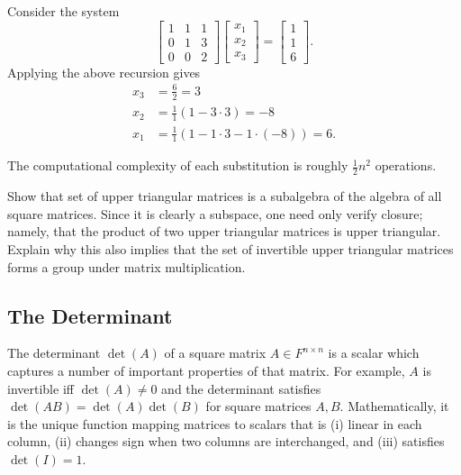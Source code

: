 \begin{example}
Consider the system
\begin{equation*}
\begin{bmatrix} 1 & 1 & 1 \\ 0 & 1 & 3 \\ 0 & 0 & 2 \end{bmatrix}
\begin{bmatrix} x_1 \\ x_2 \\ x_3 \end{bmatrix}
= \begin{bmatrix} 1 \\ 1 \\ 6 \end{bmatrix} .
\end{equation*}
Applying the above recursion gives
\begin{align*}
x_3 & = \frac{6}{2} = 3 \\
x_2 & = \frac{1}{1} (1 - 3\cdot 3) = -8 \\
x_1 & = \frac{1}{1} (1 - 1\cdot 3 - 1\cdot (-8) ) = 6. 
\end{align*}
\end{example}
The computational complexity of each substitution is roughly $\frac{1}{2} n^2$ operations.

\begin{problem}
Show that set of upper triangular matrices is a subalgebra of the algebra of all square matrices.
Since it is clearly a subspace, one need only verify closure; namely, that the product of two upper triangular matrices is upper triangular.
Explain why this also implies that the set of invertible upper triangular matrices forms a group under matrix multiplication.
\end{problem}

\subsection{The Determinant}

The determinant $\det (A)$ of a square matrix $A \in F^{n \times n}$ is a scalar which captures a number of important properties of that matrix.
For example, $A$ is invertible iff $\det(A) \neq 0$ and the determinant satisfies $\det(AB) = \det(A) \det(B)$ for square matrices $A,B$.
Mathematically, it is the unique function mapping matrices to scalars that is (i) linear in each column, (ii) changes sign when two columns are interchanged, and (iii) satisfies $\det(I) = 1$.

